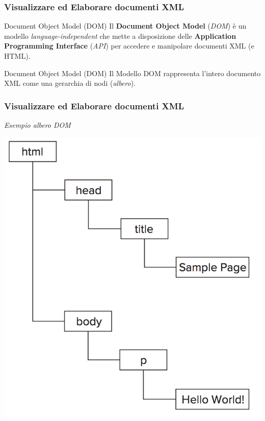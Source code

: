 \begin{frame}
    \frametitle{Visualizzare ed Elaborare documenti XML}
    \addtocounter{nframe}{1}
    

     \begin{block}{Document Object Model (DOM)}
        Il \textbf{Document Object Model} (\textit{DOM}) è un modello \textit{language-independent} che mette a disposizione delle \textbf{Application Programming Interface} (\textit{API}) per accedere e manipolare documenti XML (e HTML).

     \end{block}

     \begin{block}{Document Object Model (DOM)}
        Il Modello DOM rappresenta l'intero documento XML come una gerarchia di nodi (\textit{albero}).
     \end{block}


\end{frame}


\begin{frame}
    \frametitle{Visualizzare ed Elaborare documenti XML}
    \addtocounter{nframe}{1}
    \textit{Esempio albero DOM}    
    \begin{center}
        \includegraphics[width=.6\textwidth]{imgs/XML-DOM.png}
    \end{center}

\end{frame}

